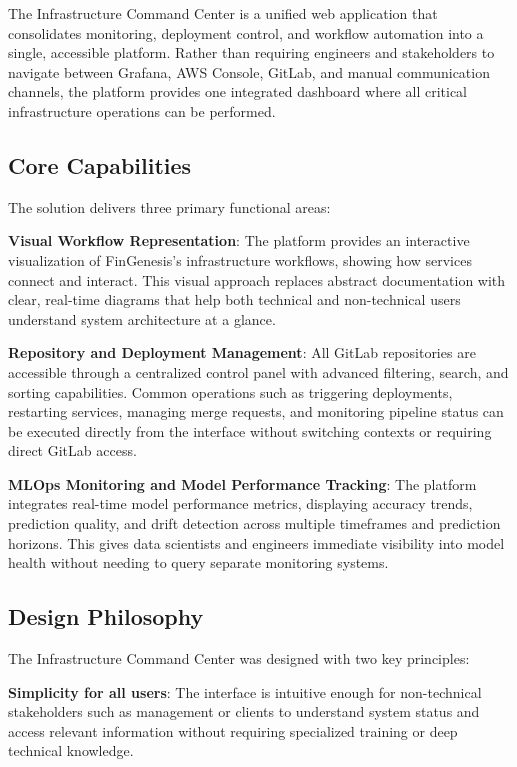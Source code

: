 The Infrastructure Command Center is a unified web application that consolidates monitoring, deployment control, and workflow automation into a single, accessible platform. Rather than requiring engineers and stakeholders to navigate between Grafana, AWS Console, GitLab, and manual communication channels, the platform provides one integrated dashboard where all critical infrastructure operations can be performed.

\subsection{Core Capabilities}

The solution delivers three primary functional areas:

\textbf{Visual Workflow Representation}: The platform provides an interactive visualization of FinGenesis's infrastructure workflows, showing how services connect and interact. This visual approach replaces abstract documentation with clear, real-time diagrams that help both technical and non-technical users understand system architecture at a glance.

\textbf{Repository and Deployment Management}: All GitLab repositories are accessible through a centralized control panel with advanced filtering, search, and sorting capabilities. Common operations such as triggering deployments, restarting services, managing merge requests, and monitoring pipeline status can be executed directly from the interface without switching contexts or requiring direct GitLab access.

\textbf{MLOps Monitoring and Model Performance Tracking}: The platform integrates real-time model performance metrics, displaying accuracy trends, prediction quality, and drift detection across multiple timeframes and prediction horizons. This gives data scientists and engineers immediate visibility into model health without needing to query separate monitoring systems.

\subsection{Design Philosophy}

The Infrastructure Command Center was designed with two key principles:

\textbf{Simplicity for all users}: The interface is intuitive enough for non-technical stakeholders such as management or clients to understand system status and access relevant information without requiring specialized training or deep technical knowledge.


